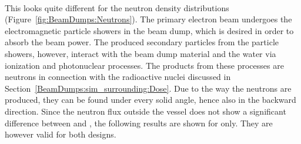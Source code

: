  \\This looks quite different for the neutron density distributions (Figure~\ref{fig:BeamDumps:Neutrons}).
 The primary electron beam undergoes the electromagnetic particle showers in the beam dump, which is desired in order to absorb the beam power.
 The produced secondary particles from the particle showers, however, interact with the beam dump material and the water via ionization and photonuclear processes.
 The products from these processes are neutrons in connection with the radioactive nuclei discussed in Section~\ref{BeamDumps:sim_surrounding:Dose}.
 Due to the way the neutrons are produced, they can be found under every solid angle, hence also in the backward direction.
 Since the neutron flux outside the vessel does not show a significant difference between \designone and \designtwo, the following results are shown for \designone only.
 They are however valid for both designs.
